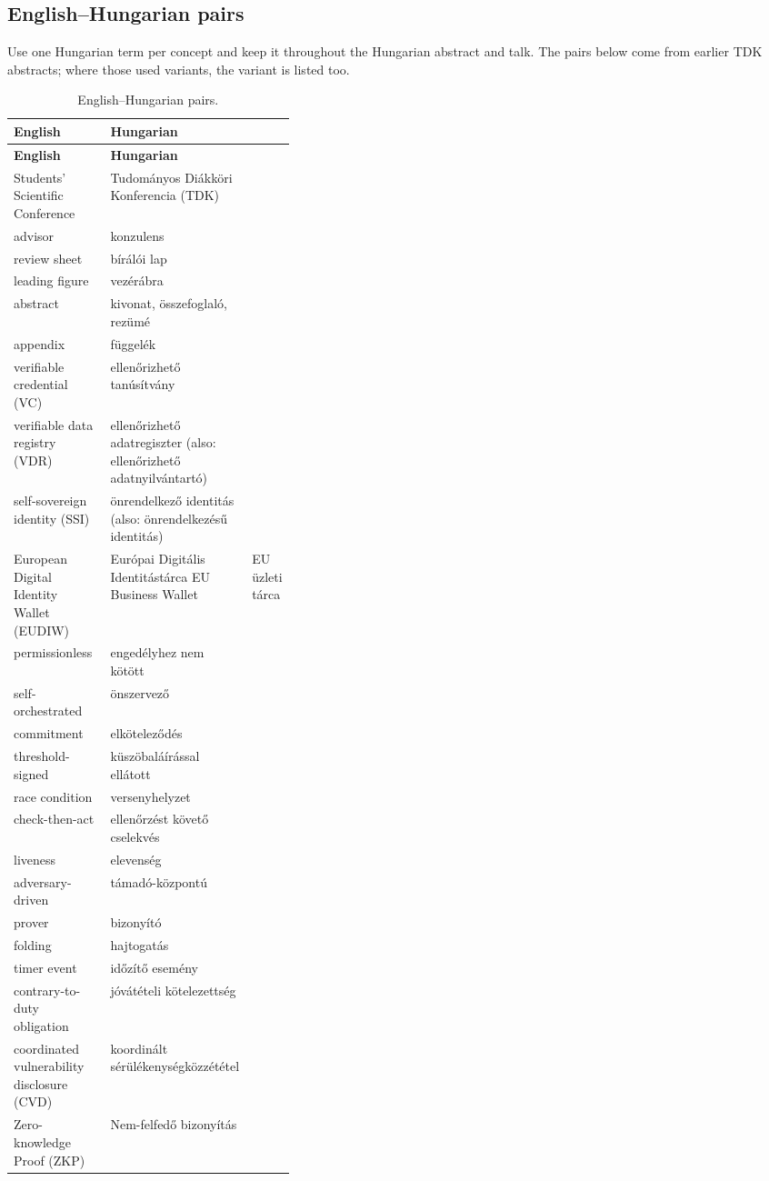 \subsection{English--Hungarian pairs}
Use one Hungarian term per concept and keep it throughout the Hungarian abstract and talk. The pairs below come from earlier TDK abstracts; where those used variants, the variant is listed too.
{\small
\begin{xltabular}{\linewidth}{>{\raggedright\arraybackslash}p{0.36\linewidth} >{\raggedright\arraybackslash}X}
  \caption{English--Hungarian pairs.}\label{tab:glossary-hu}\\
  \toprule \textbf{English} & \textbf{Hungarian} \\ \midrule \endfirsthead
  \toprule \textbf{English} & \textbf{Hungarian} \\ \midrule \endhead
  \bottomrule \endlastfoot
  Students' Scientific Conference & Tudományos Diákköri Konferencia (TDK) \\
  advisor & konzulens \\
  review sheet & bírálói lap \\
  leading figure & vezérábra \\
  abstract & kivonat, összefoglaló, rezümé \\
  appendix & függelék \\
  verifiable credential (VC) & ellenőrizhető tanúsítvány \\
  verifiable data registry (VDR) & ellenőrizhető adatregiszter (also: ellenőrizhető adatnyilvántartó) \\
  self-sovereign identity (SSI) & önrendelkező identitás (also: önrendelkezésű identitás) \\
  European Digital Identity Wallet (EUDIW) & Európai Digitális Identitástárca
  EU Business Wallet & EU üzleti tárca \\
  permissionless & engedélyhez nem kötött \\
  self-orchestrated & önszervező \\
  commitment & elköteleződés \\
  threshold-signed & küszöbaláírással ellátott \\
  race condition & versenyhelyzet \\
  check-then-act & ellenőrzést követő cselekvés \\
  liveness & elevenség \\
  adversary-driven & támadó-központú \\
  prover & bizonyító \\
  folding & hajtogatás \\
  timer event & időzítő esemény \\
  contrary-to-duty obligation & jóvátételi kötelezettség \\
  coordinated vulnerability disclosure (CVD) & koordinált sérülékenységközzététel \\
  Zero-knowledge Proof (ZKP) & Nem-felfedő bizonyítás
\end{xltabular}
}
